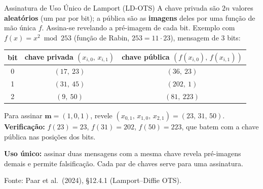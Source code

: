 \documentclass{beamer}
\begin{document}
\begin{frame}{Assinatura de Uso Único de Lamport (LD-OTS)}
    A chave privada são $2n$ valores \textbf{aleatórios} (um par por bit); a pública são as \textbf{imagens} deles por uma função de mão única $f$. Assina-se revelando a pré-imagem de cada bit.
    \vspace{0.2em}
    {\footnotesize Exemplo com $f(x) = x^2 \bmod 253$ (função de Rabin, $253 = 11 \cdot 23$), mensagem de 3 bits:}
    \begin{center}
    \renewcommand{\arraystretch}{1.0}
    \scriptsize
    \begin{tabular}{c c c}
        \toprule
        \textbf{bit} & \textbf{chave privada} $(x_{i,0},\,x_{i,1})$ & \textbf{chave pública} $(f(x_{i,0}),\,f(x_{i,1}))$ \\
        \midrule
        0 & $(17,\ 23)$ & $(36,\ 23)$ \\
        1 & $(31,\ 45)$ & $(202,\ 1)$ \\
        2 & $(9,\ 50)$ & $(81,\ 223)$ \\
        \bottomrule
    \end{tabular}
    \end{center}
    \vspace{-0.5em}
    \begin{tcolorbox}[colback=blue!5,colframe=blue!50!black,boxrule=0.5pt]
        \footnotesize
        Para assinar $\mathbf{m} = (1,0,1)$, revele $(x_{0,1},\,x_{1,0},\,x_{2,1}) = (23,\,31,\,50)$.\\
        \textbf{Verificação:} $f(23)=23$, $f(31)=202$, $f(50)=223$, que batem com a chave pública nas posições dos bits. \checkmark
    \end{tcolorbox}
    \vspace{-0.5em}
    \begin{tcolorbox}[colback=red!5,colframe=red!60!black,boxrule=0.5pt]
        \footnotesize
        \textbf{Uso único:} assinar duas mensagens com a mesma chave revela pré-imagens demais e permite falsificação. Cada par de chaves serve para uma assinatura.
    \end{tcolorbox}
    \smallskip
    {\tiny Fonte: Paar et al.\ (2024), §12.4.1 (Lamport--Diffie OTS).}
\end{frame}
\end{document}
